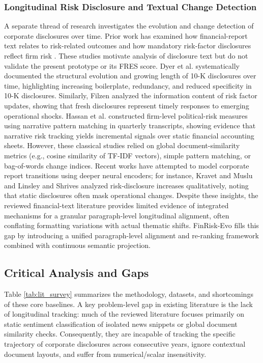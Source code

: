 \documentclass[pdflatex,sn-basic,Numbered]{sn-jnl}
\begin{document}
\subsubsection{Longitudinal Risk Disclosure and Textual Change Detection}
A separate thread of research investigates the evolution and change detection of corporate disclosures over time. Prior work has examined how financial-report text relates to risk-related outcomes and how mandatory risk-factor disclosures reflect firm risk \cite{kogan2009,campbell2014}. These studies motivate analysis of disclosure text but do not validate the present prototype or its FRES score. Dyer et al. \cite{dyer2017} systematically documented the structural evolution and growing length of 10-K disclosures over time, highlighting increasing boilerplate, redundancy, and reduced specificity in 10-K disclosures. Similarly, Filzen \cite{filzen2015} analyzed the information content of risk factor updates, showing that fresh disclosures represent timely responses to emerging operational shocks. Hassan et al. \cite{hassan2019} constructed firm-level political-risk measures using narrative pattern matching in quarterly transcripts, showing evidence that narrative risk tracking yields incremental signals over static financial accounting sheets. However, these classical studies relied on global document-similarity metrics (e.g., cosine similarity of TF-IDF vectors), simple pattern matching, or bag-of-words change indices. Recent works have attempted to model corporate report transitions using deeper neural encoders; for instance, Kravet and Muslu \cite{kravet2013} and Linsley and Shrives \cite{linsley2006} analyzed risk-disclosure increases qualitatively, noting that static disclosures often mask operational changes. Despite these insights, the reviewed financial-text literature provides limited evidence of integrated mechanisms for a granular paragraph-level longitudinal alignment, often conflating formatting variations with actual thematic shifts. FinRisk-Evo fills this gap by introducing a unified paragraph-level alignment and re-ranking framework combined with continuous semantic projection.

\subsection{Critical Analysis and Gaps}
Table \ref{tab:lit_survey} summarizes the methodology, datasets, and shortcomings of these core baselines. A key problem-level gap in existing literature is the lack of longitudinal tracking: much of the reviewed literature focuses primarily on static sentiment classification of isolated news snippets or global document similarity checks. Consequently, they are incapable of tracking the specific trajectory of corporate disclosures across consecutive years, ignore contextual document layouts, and suffer from numerical/scalar insensitivity.
\end{document}
